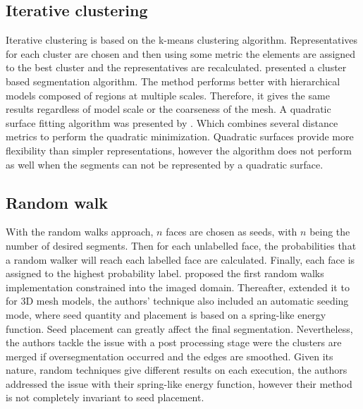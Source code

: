 

\subsection{Iterative clustering}

Iterative clustering is based on the k-means clustering algorithm.
Representatives for each cluster are chosen and then using some metric  the elements are assigned to the best cluster and the representatives are recalculated.
\cite{Lai2006} presented a cluster based segmentation algorithm.
The method performs better with hierarchical models composed of regions at multiple scales.
Therefore, it gives the same results regardless of model scale or the coarseness of the mesh.
A quadratic surface fitting algorithm was presented by \cite{Yan2012}.
Which combines several distance metrics to perform the quadratic minimization.
Quadratic surfaces provide more flexibility than simpler representations, however the algorithm does not perform as well when the segments 
can not be represented by a quadratic surface.



\subsection{Random walk}

With the random walks approach, $n$ faces are chosen as seeds, with $n$ being the number of desired segments.
Then for each unlabelled face, the probabilities that a random walker will reach each labelled face are calculated.
Finally, each face is assigned to the highest probability label.
\cite{Grady2006} proposed the first random walks implementation constrained into the imaged domain.
Thereafter, \cite{Lai2009} extended it to for 3D mesh models, the authors' technique also included an automatic seeding mode, where seed quantity and placement is based on a spring-like energy function.
Seed placement can greatly affect the final segmentation.
Nevertheless, the authors tackle the issue with a post processing stage were the clusters are merged if oversegmentation occurred and the edges are smoothed.
Given its nature, random techniques give different results on each execution, the authors addressed the issue with their spring-like energy function, however their method is not completely invariant to seed placement.
 

